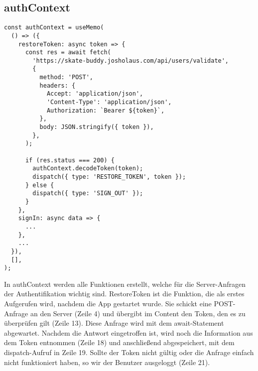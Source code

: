 \subsection{authContext}
\begin{lstlisting}
const authContext = useMemo(
  () => ({
    restoreToken: async token => {
      const res = await fetch(
        'https://skate-buddy.josholaus.com/api/users/validate',
        {
          method: 'POST',
          headers: {
            Accept: 'application/json',
            'Content-Type': 'application/json',
            Authorization: `Bearer ${token}`,
          },
          body: JSON.stringify({ token }),
        },
      );

      if (res.status === 200) {
        authContext.decodeToken(token);
        dispatch({ type: 'RESTORE_TOKEN', token });
      } else {
        dispatch({ type: 'SIGN_OUT' });
      }
    },
    signIn: async data => {
      ...
    },
    ...
  }),
  [],
);
\end{lstlisting}

In authContext werden alle Funktionen erstellt, welche für die Server-Anfragen der Authentifikation
wichtig sind. RestoreToken ist die Funktion, die als erstes Aufgerufen wird, nachdem die App
gestartet wurde. Sie schickt eine POST-Anfrage an den Server (Zeile 4) und übergibt im Content den
Token, den es zu überprüfen gilt (Zeile 13). Diese Anfrage wird mit dem await-Statement abgewartet.
Nachdem die Antwort eingetroffen ist, wird noch die Information aus dem Token entnommen (Zeile 18)
und anschließend abgespeichert, mit dem dispatch-Aufruf in Zeile 19. Sollte der Token nicht gültig
oder die Anfrage einfach nicht funktioniert haben, so wir der Benutzer ausgeloggt (Zeile 21).
